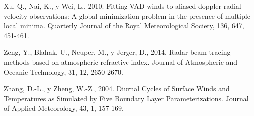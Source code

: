 \documentclass[12pt,spanish,oneside, a4paper]{book}
\begin{document}
\hypertarget{ref-Xu2010}{}
Xu, Q., Nai, K., y Wei, L., 2010. Fitting VAD winds to aliased doppler
radial-velocity observations: A global minimization problem in the
presence of multiple local minima. Quarterly Journal of the Royal
Meteorological Society, 136, 647, 451-461.

\hypertarget{ref-Zeng2014}{}
Zeng, Y., Blahak, U., Neuper, M., y Jerger, D., 2014. Radar beam tracing
methods based on atmospheric refractive index. Journal of Atmospheric
and Oceanic Technology, 31, 12, 2650-2670.

\hypertarget{ref-Zhang2004}{}
Zhang, D.-L., y Zheng, W.-Z., 2004. Diurnal Cycles of Surface Winds and
Temperatures as Simulated by Five Boundary Layer Parameterizations.
Journal of Applied Meteorology, 43, 1, 157-169.
\end{document}
